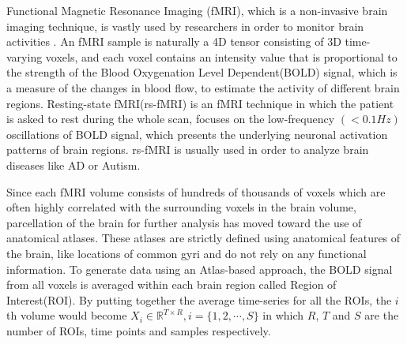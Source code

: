 \documentclass[journal]{IEEEtran}
\begin{document}
	
	Functional Magnetic Resonance Imaging (fMRI)\cite{r23}, which is a non-invasive brain imaging technique, is vastly used by researchers in order to monitor brain activities \cite{r04}.
%	
	An fMRI sample is naturally a 4D tensor consisting of 3D time-varying voxels, and each voxel contains an intensity value that is proportional to the strength of the Blood Oxygenation Level Dependent(BOLD) signal, which is a measure of the changes in blood flow, to estimate the activity of different brain regions\cite{r07}.
	Resting-state fMRI(rs-fMRI) is an fMRI technique in which the patient is asked to rest during the whole scan, focuses on the low-frequency $\left( < 0.1 Hz \right)$  oscillations of BOLD signal, which presents the underlying neuronal activation patterns of brain regions. rs-fMRI is usually used in order to analyze brain diseases like AD or Autism\cite{r33,r34}.

	
	Since each fMRI volume consists of hundreds of thousands of voxels which are often highly correlated with the surrounding voxels in the brain volume, parcellation of the brain for further analysis has moved toward the use
	of anatomical atlases. These atlases are strictly defined using
	anatomical features of the brain, like locations of common gyri
	and do not rely on any functional information.
	To generate data
	using an Atlas-based approach, the BOLD signal from all voxels is averaged within each brain region called Region of Interest(ROI)\cite{r09}.
	By putting together the average time-series for all the ROIs, the $i$th volume would become $X_i \in \mathbb{R}^{T \times R} , i = \{1,2,\cdots, S\}$ in which $R$, $T$ and $S$ are the number of ROIs, time points and samples respectively.
	 
	
	
\end{document}
